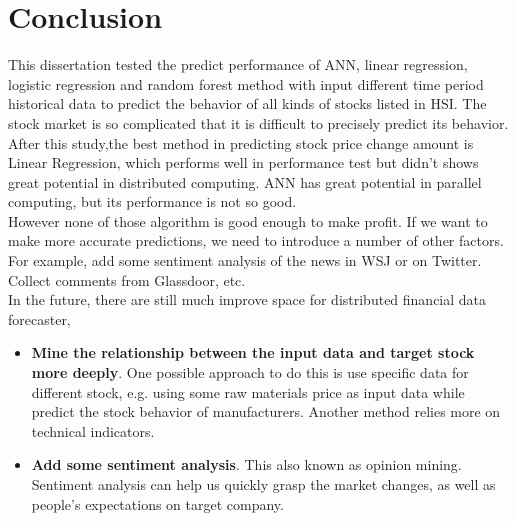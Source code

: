 \chapter{Conclusion}
\label{ch:conclusion}

This dissertation tested the predict performance of ANN, linear regression, logistic regression and random forest method with input different time period historical data to predict the behavior of all kinds of stocks listed in HSI. The stock market is so complicated that it is difficult to precisely predict its behavior.\\


After this study,the best method in predicting stock price change amount is Linear Regression, which performs well in performance test but didn't shows great potential in distributed computing. ANN has great potential in parallel computing, but its performance is not so good. \\

However none of those algorithm is good enough to make profit. If we want to make more accurate predictions, we need to introduce a number of other factors. For example, add some sentiment analysis of the news in WSJ or on Twitter. Collect comments from Glassdoor, etc.\\


In the future, there are still much improve space for distributed financial data forecaster,
\begin{itemize}
	\item \textbf{Mine the relationship between the input data and target stock more deeply}. One possible approach to do this is use specific data for different stock, e.g. using some raw materials price as input data while predict the stock behavior of manufacturers. Another method relies more on technical indicators.
	\item \textbf{Add some sentiment analysis}. This also known as opinion mining. Sentiment analysis can help us quickly grasp the market changes, as well as people's expectations on target company.
\end{itemize}